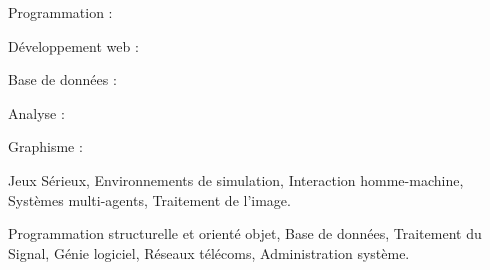 







Programmation : \linebreak\linebreak
{} 

\divider\smallskip \linebreak
Développement web : \linebreak\linebreak
{}


\divider\smallskip \linebreak
Base de données : \linebreak\linebreak
{}

\divider\smallskip \linebreak
Analyse : \linebreak\linebreak
{}

\divider\smallskip \linebreak
Graphisme : \linebreak\linebreak
{}


\divider

\divider


\medskip


Jeux Sérieux, Environnements de simulation, Interaction homme-machine, Systèmes multi-agents, Traitement de l'image.

\divider

Programmation structurelle et orienté objet, Base de données, Traitement du Signal, Génie logiciel, Réseaux télécoms, Administration système. 
